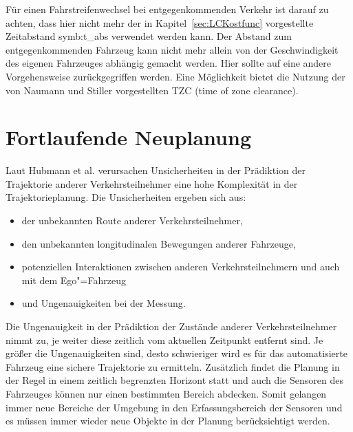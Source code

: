 F\"ur einen Fahrstreifenwechsel bei entgegenkommenden Verkehr ist darauf zu achten, dass hier nicht mehr der in Kapitel~\ref{sec:LCKostfunc} vorgestellte Zeitabstand \gls{symb:t_abs} verwendet werden kann.
Der Abstand zum entgegenkommenden Fahrzeug kann nicht mehr allein von der Geschwindigkeit des eigenen Fahrzeuges abh\"angig gemacht werden.
Hier sollte auf eine andere Vorgehensweise zur\"uckgegriffen werden.
Eine M\"oglichkeit bietet die Nutzung der von Naumann und Stiller \cite{Naumann2017towards} vorgestellten TZC (time of zone clearance).

\section{Fortlaufende Neuplanung}
\label{sec:Neuplanung}

Laut Hubmann et al. \cite{Hubmann2018} verursachen Unsicherheiten in der Pr\"adiktion der Trajektorie anderer Verkehrsteilnehmer eine hohe Komplexit\"at in der Trajektorieplanung.
Die Unsicherheiten ergeben sich aus:

\begin{itemize}
\item der unbekannten Route anderer Verkehrsteilnehmer,
\item den unbekannten longitudinalen Bewegungen anderer Fahrzeuge, 
\item potenziellen Interaktionen zwischen anderen Verkehrsteilnehmern und auch mit dem Ego"=Fahrzeug
\item und Ungenauigkeiten bei der Messung.
\end{itemize}

Die Ungenauigkeit in der Pr\"adiktion der Zust\"ande anderer Verkehrsteilnehmer nimmt zu, je weiter diese zeitlich vom aktuellen Zeitpunkt entfernt sind.
Je gr\"o{\ss}er die Ungenauigkeiten sind, desto schwieriger wird es f\"ur das automatisierte Fahrzeug eine sichere Trajektorie zu ermitteln.
Zus\"atzlich findet die Planung in der Regel in einem zeitlich begrenzten Horizont statt und auch die Sensoren des Fahrzeuges k\"onnen nur einen bestimmten Bereich abdecken.
Somit gelangen immer neue Bereiche der Umgebung in den Erfassungsbereich der Sensoren und es m\"ussen immer wieder neue Objekte in der Planung ber\"ucksichtigt werden.

